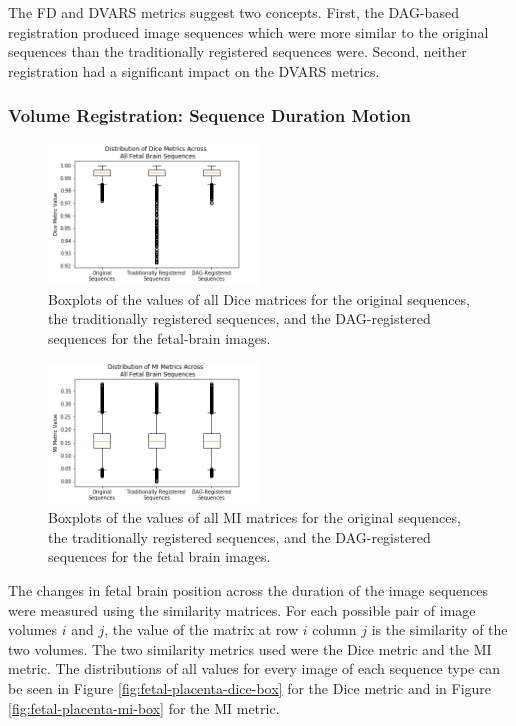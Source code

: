 The FD and DVARS metrics suggest two concepts. First, the DAG-based registration produced image sequences which were more similar to the original sequences than the traditionally registered sequences were. Second, neither registration had a significant impact on the DVARS metrics.

\subsubsection{Volume Registration: Sequence Duration Motion}

\begin{figure}
\centering
\includegraphics[width=0.5\textwidth]{6/figures/fetal-brain-dice-box.png}
\caption{Boxplots of the values of all Dice matrices for the original sequences, the traditionally registered sequences, and the DAG-registered sequences for the fetal-brain images.}
\label{fig:fetal-brain-dice-box}
\end{figure}

\begin{figure}
\centering
\includegraphics[width=0.5\textwidth]{6/figures/fetal-brain-mi-box.png}
\caption{Boxplots of the values of all MI matrices for the original sequences, the traditionally registered sequences, and the DAG-registered sequences for the fetal brain images.}
\label{fig:fetal-brain-mi-box}
\end{figure}

The changes in fetal brain position across the duration of the image sequences were measured using the similarity matrices. For each possible pair of image volumes $i$ and $j$, the value of the matrix at row $i$ column $j$ is the similarity of the two volumes. The two similarity metrics used were the Dice metric and the MI metric. The distributions of all values for every image of each sequence type can be seen in Figure \ref{fig:fetal-placenta-dice-box} for the Dice metric and in Figure \ref{fig:fetal-placenta-mi-box} for the MI metric.

